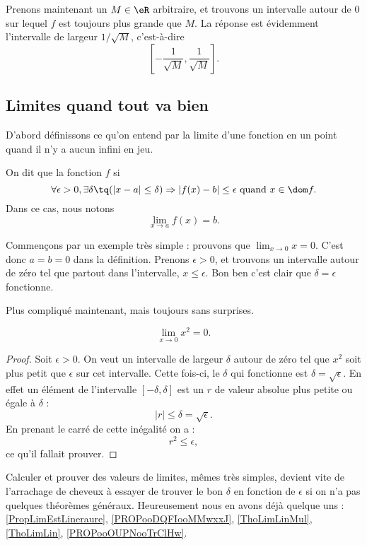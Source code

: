 Prenons maintenant un $M\in\eR$ arbitraire, et trouvons un intervalle autour de $0$ sur lequel $f$ est toujours plus grande que $M$. La réponse est évidemment l'intervalle de largeur $1/\sqrt{M}$, c'est-à-dire
\[
  \left[ -\frac{ 1 }{ \sqrt{M} },\frac{ 1 }{ \sqrt{M} } \right].
\]

\subsection{Limites quand tout va bien}

D'abord définissons ce qu'on entend par la limite d'une fonction en un point quand il n'y a aucun infini en jeu.
\begin{definition}      \label{DefLimPointSansInfini}
 On dit que la fonction $f$  si
\[
  \forall \epsilon>0,\exists\delta\tq (| x-a |\leq\delta)\Rightarrow | f(x)-b |\leq \epsilon\text{ quand }x\in\dom f.
\]
Dans ce cas, nous notons
\begin{equation}
\lim_{x\to a}f(x)=b.
\end{equation}
\end{definition}

Commençons par un exemple très simple : prouvons que $\lim_{x\to 0}x=0$. C'est donc $a=b=0$ dans la définition. Prenons $\epsilon>0$, et trouvons un intervalle autour de zéro tel que partout dans l'intervalle, $x\leq \epsilon$. Bon ben c'est clair que $\delta=\epsilon$ fonctionne.

Plus compliqué maintenant, mais toujours sans surprises.

\begin{proposition}
\[
  \lim_{x\to 0}x^2=0.
\]

\end{proposition}

\begin{proof}
Soit $\epsilon>0$. On veut un intervalle de largeur $\delta$ autour de zéro tel que $x^2$ soit plus petit que $\epsilon$ sur cet intervalle. Cette fois-ci, le $\delta$ qui fonctionne est $\delta=\sqrt{\epsilon}$. En effet un élément de l'intervalle $[-\delta,\delta]$ est un $r$ de valeur absolue plus petite ou égale à $\delta$ :
\[
| r |\leq\delta=\sqrt{\epsilon}.
\]
En prenant le carré de cette inégalité on a :
\[
  r^2\leq\epsilon,
\]
ce qu'il fallait prouver.
\end{proof}

Calculer et prouver des valeurs de limites, mêmes très simples, devient vite de l'arrachage de cheveux à essayer de trouver le bon $\delta$ en fonction de $\epsilon$ si on n'a pas quelques théorèmes généraux. Heureusement nous en avons déjà quelque uns : \ref{PropLimEstLineraure}, \ref{PROPooDQFIooMMwxxJ}, \ref{ThoLimLinMul}, \ref{ThoLimLin}, \ref{PROPooOUPNooTrClHw}.

